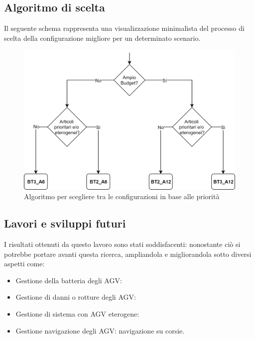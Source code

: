 \documentclass[12pt]{article}
\begin{document}
\subsection{Algoritmo di scelta}
Il seguente schema rappresenta una visualizzazione minimalista del processo di scelta della configurazione migliore per un determinato scenario. 
\begin{figure}[H]
\centering
  \includegraphics[width=1\linewidth]{Figures/Scelta_Config/AlgoritmoScelta.png}
  \caption{Algoritmo per scegliere tra le configurazioni in base alle priorità}\label{fig:waiting_total}
\end{figure}

\subsection{Lavori e sviluppi futuri}
I risultati ottenuti da questo lavoro sono stati soddisfacenti: nonostante ciò si potrebbe portare avanti questa ricerca, ampliandola e migliorandola sotto diversi aspetti come:
\begin{itemize}
\item Gestione della batteria degli AGV:
\item Gestione di danni o rotture degli AGV:
\item Gestione di sistema con AGV eterogene:
\item Gestione navigazione degli AGV: navigazione su corsie.
\end{itemize}

\newpage


\end{document}
